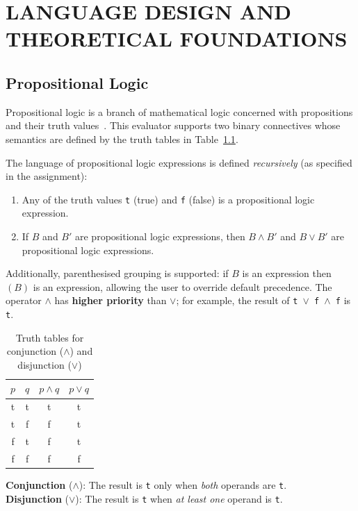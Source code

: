 \chapter{LANGUAGE DESIGN AND THEORETICAL FOUNDATIONS}

\section{Propositional Logic}

Propositional logic is a branch of mathematical logic concerned with propositions and their truth values~\citep{ben2012mathematical}. This evaluator supports two binary connectives whose semantics are defined by the truth tables in Table~\ref{table:truth_tables}.

The language of propositional logic expressions is defined \emph{recursively} (as specified in the assignment):

\begin{enumerate}
    \item Any of the truth values \texttt{t} (true) and \texttt{f} (false) is a propositional logic expression.
    \item If $B$ and $B'$ are propositional logic expressions, then $B \wedge B'$ and $B \vee B'$ are propositional logic expressions.
\end{enumerate}

Additionally, parenthesised grouping is supported: if $B$ is an expression then $(B)$ is an expression, allowing the user to override default precedence. The operator $\wedge$ has \textbf{higher priority} than $\vee$; for example, the result of \texttt{t $\vee$ f $\wedge$ f} is \texttt{t}.

\begin{table}[H]
\centering
\caption{Truth tables for conjunction ($\wedge$) and disjunction ($\vee$)}
\label{table:truth_tables}
\begin{tabular}{@{}cccc@{}}
\toprule
$p$ & $q$ & $p \wedge q$ & $p \vee q$ \\
\midrule
t & t & t & t \\
t & f & f & t \\
f & t & f & t \\
f & f & f & f \\
\bottomrule
\end{tabular}
\end{table}

\textbf{Conjunction} ($\wedge$): The result is \texttt{t} only when \emph{both} operands are \texttt{t}. \\
\textbf{Disjunction} ($\vee$): The result is \texttt{t} when \emph{at least one} operand is \texttt{t}.

